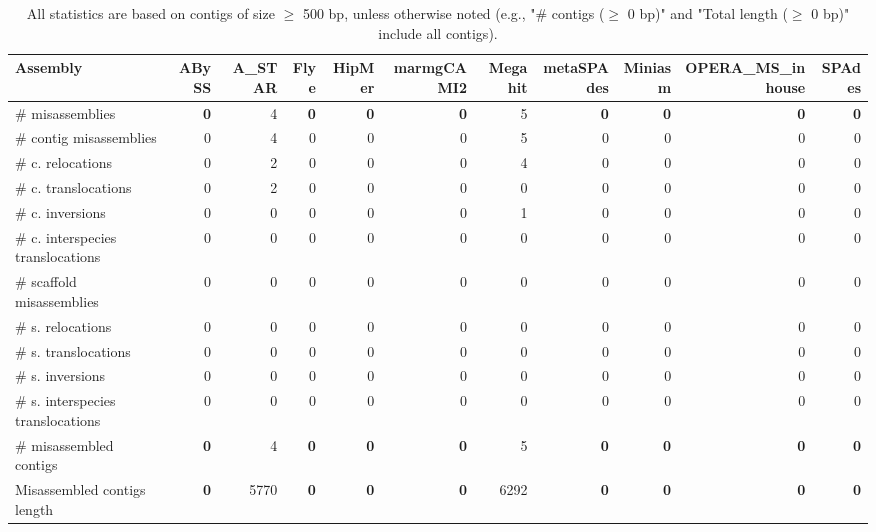 \documentclass[12pt,a4paper]{article}
\begin{document}
\begin{table}[ht]
\begin{center}
\caption{All statistics are based on contigs of size $\geq$ 500 bp, unless otherwise noted (e.g., "\# contigs ($\geq$ 0 bp)" and "Total length ($\geq$ 0 bp)" include all contigs).}
\begin{tabular}{|l*{10}{|r}|}
\hline
Assembly & ABySS & A\_STAR & Flye & HipMer & marmgCAMI2 & Megahit & metaSPAdes & Miniasm & OPERA\_MS\_inhouse & SPAdes \\ \hline
\# misassemblies & {\bf 0} & 4 & {\bf 0} & {\bf 0} & {\bf 0} & 5 & {\bf 0} & {\bf 0} & {\bf 0} & {\bf 0} \\ \hline
\hspace{2mm}\# contig misassemblies & 0 & 4 & 0 & 0 & 0 & 5 & 0 & 0 & 0 & 0 \\ \hline
\hspace{5mm}\# c. relocations & 0 & 2 & 0 & 0 & 0 & 4 & 0 & 0 & 0 & 0 \\ \hline
\hspace{5mm}\# c. translocations & 0 & 2 & 0 & 0 & 0 & 0 & 0 & 0 & 0 & 0 \\ \hline
\hspace{5mm}\# c. inversions & 0 & 0 & 0 & 0 & 0 & 1 & 0 & 0 & 0 & 0 \\ \hline
\hspace{5mm}\# c. interspecies translocations & 0 & 0 & 0 & 0 & 0 & 0 & 0 & 0 & 0 & 0 \\ \hline
\hspace{2mm}\# scaffold misassemblies & 0 & 0 & 0 & 0 & 0 & 0 & 0 & 0 & 0 & 0 \\ \hline
\hspace{5mm}\# s. relocations & 0 & 0 & 0 & 0 & 0 & 0 & 0 & 0 & 0 & 0 \\ \hline
\hspace{5mm}\# s. translocations & 0 & 0 & 0 & 0 & 0 & 0 & 0 & 0 & 0 & 0 \\ \hline
\hspace{5mm}\# s. inversions & 0 & 0 & 0 & 0 & 0 & 0 & 0 & 0 & 0 & 0 \\ \hline
\hspace{5mm}\# s. interspecies translocations & 0 & 0 & 0 & 0 & 0 & 0 & 0 & 0 & 0 & 0 \\ \hline
\# misassembled contigs & {\bf 0} & 4 & {\bf 0} & {\bf 0} & {\bf 0} & 5 & {\bf 0} & {\bf 0} & {\bf 0} & {\bf 0} \\ \hline
Misassembled contigs length & {\bf 0} & 5770 & {\bf 0} & {\bf 0} & {\bf 0} & 6292 & {\bf 0} & {\bf 0} & {\bf 0} & {\bf 0} \\ \hline

\end{tabular}
\end{center}
\end{table}
\end{document}
